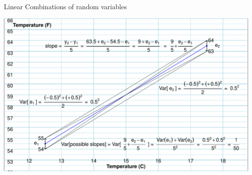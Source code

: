 \documentclass[10pt]{beamer}\usepackage[]{graphicx}\usepackage[]{color}
\makeatletter
\def\maxwidth{ %
  \ifdim\Gin@nat@width>\linewidth
    \linewidth
  \else
    \Gin@nat@width
  \fi
}
\newenvironment{knitrout}{}{} %
\makeatother
\begin{document}
\begin{frame}[fragile]{Linear Combinations of random variables}
\begin{knitrout}\tiny
{}\color{fgcolor}

{\centering \includegraphics[width=\maxwidth]{figure/unnamed-chunk-16-1} 

}


\end{knitrout}

\end{frame}
\end{document}
